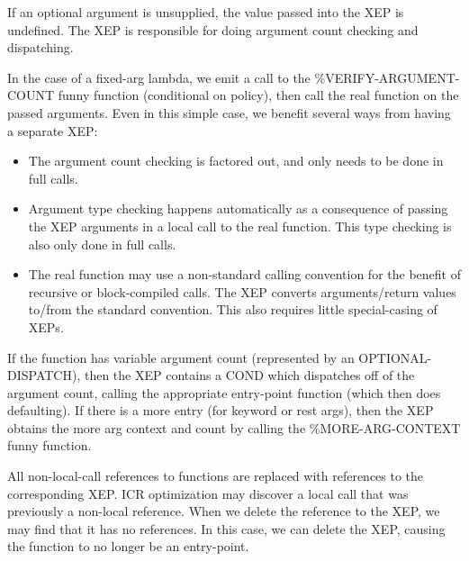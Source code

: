 If an optional argument is unsupplied, the value passed into the XEP is
undefined.  The XEP is responsible for doing argument count checking and
dispatching.  

In the case of a fixed-arg lambda, we emit a call to the \%VERIFY-ARGUMENT-COUNT
funny function (conditional on policy), then call the real function on the
passed arguments.  Even in this simple case, we benefit several ways from
having a separate XEP:
\begin{itemize}
\item The argument count checking is factored out, and only needs to
  be done in full calls.
\item Argument type checking happens automatically as a consequence of
  passing the XEP arguments in a local call to the real function.
  This type checking is also only done in full calls.
\item The real function may use a non-standard calling convention for
  the benefit of recursive or block-compiled calls.  The XEP converts
  arguments/return values to/from the standard convention.  This also
  requires little special-casing of XEPs.
\end{itemize}

If the function has variable argument count (represented by an
OPTIONAL-DISPATCH), then the XEP contains a COND which dispatches off of the
argument count, calling the appropriate entry-point function (which then does
defaulting).  If there is a more entry (for keyword or rest args), then the XEP
obtains the more arg context and count by calling the \%MORE-ARG-CONTEXT funny
function.

All non-local-call references to functions are replaced with references to the
corresponding XEP.  ICR optimization may discover a local call that was
previously a non-local reference.  When we delete the reference to the XEP, we
may find that it has no references.  In this case, we can delete the XEP,
causing the function to no longer be an entry-point.


